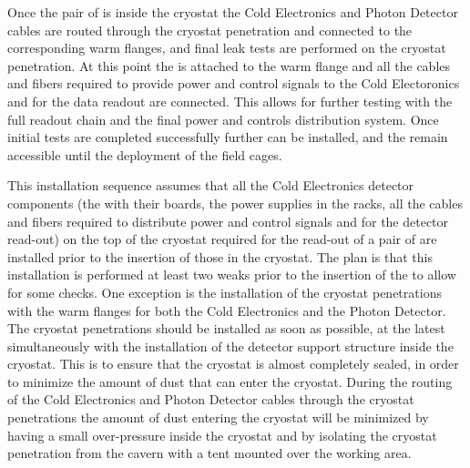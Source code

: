 Once the pair of  is inside the cryostat the Cold Electronics
and Photon Detector cables are routed through the cryostat penetration and
connected to the corresponding warm flanges, and final leak tests are performed
on the cryostat penetration. At this point the  is attached
to the warm flange and all the cables and fibers required to provide 
power and control signals to the Cold Electoronics and for the data
readout are connected. This allows for further testing with the full 
 readout chain and the final power and controls distribution
system. Once initial tests are completed successfully further 
can be installed, and the  remain accessible until the 
deployment of the field cages.

This installation sequence assumes that all the Cold Electronics detector 
components (the  with their boards, the power supplies in 
the racks, all the cables and fibers required to distribute power and
control signals and for the detector read-out) on the top of the cryostat 
required for the read-out of a pair of  are installed prior 
to the insertion of those  in the cryostat. The plan is 
that this installation is performed at least two weaks prior to the 
insertion of the  to allow for some checks. One exception
is the installation of the cryostat penetrations with the warm flanges
for both the Cold Electronics and the Photon Detector. The cryostat
penetrations should be installed as soon as possible, at the latest
simultaneously with the installation of the detector support structure
inside the cryostat. This is to ensure that the cryostat is almost 
completely sealed, in order to minimize the amount of dust that can 
enter the cryostat. During the routing of the Cold Electronics and
Photon Detector cables through the cryostat penetrations the amount
of dust entering the cryostat will be minimized by having a small
over-pressure inside the cryostat and by isolating the cryostat penetration
from the cavern with a tent mounted over the working area.

